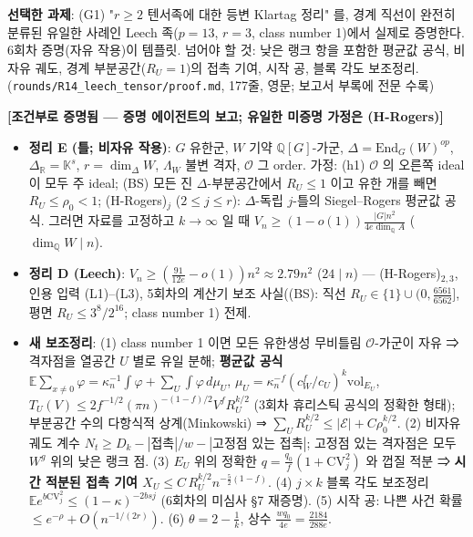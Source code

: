 \textbf{선택한 과제}: (G1) "\(r\ge2\) 텐서족에 대한 등변 Klartag 정리" 를, 경계 직선이 완전히 분류된 유일한 사례인 Leech 족(\(p=13\), \(r=3\), class number 1)에서 실제로 증명한다. 6회차 증명(자유 작용)이 템플릿. 넘어야 할 것: 낮은 랭크 항을 포함한 평균값 공식, 비자유 궤도, 경계 부분공간(\(R_U=1\))의 접촉 기여, 시작 공, 블록 각도 보조정리. (\texttt{rounds/R14\_leech\_tensor/proof.md}, 177줄, 영문; 보고서 부록에 전문 수록)

\textbf{{[}조건부로 증명됨 --- 증명 에이전트의 보고; 유일한 미증명 가정은 (H-Rogers){]}}

\begin{itemize}
\tightlist
\item
  \textbf{정리 E (틀; 비자유 작용)}: \(G\) 유한군, \(W\) 기약 \(\mathbb Q[G]\)-가군, \(\Delta=\mathrm{End}_G(W)^{op}\), \(\Delta_\mathbb R=\mathbb K^s\), \(r=\dim_\Delta W\), \(\Lambda_W\) 불변 격자, \(\mathcal O\) 그 order. 가정: (h1) \(\mathcal O\) 의 오른쪽 ideal 이 모두 주 ideal; (BS) 모든 진 \(\Delta\)-부분공간에서 \(R_U\le1\) 이고 유한 개를 빼면 \(R_U\le\rho_0<1\); (H-Rogers)\(_j\) (\(2\le j\le r\)): \(\Delta\)-독립 \(j\)-틀의 Siegel--Rogers 평균값 공식. 그러면 자료를 고정하고 \(k\to\infty\) 일 때 \(V_n\ge(1-o(1))\frac{|G|n^2}{4e\dim_\mathbb QA}\) (\(\dim_\mathbb QW\mid n\)).
\item
  \textbf{정리 D (Leech)}: \(V_n\ge(\frac{91}{12e}-o(1))n^2\approx2.79n^2\) (\(24\mid n\)) --- (H-Rogers)\(_{2,3}\), 인용 입력 (L1)--(L3), 5회차의 계산기 보조 사실((BS): 직선 \(R_U\in\{1\}\cup(0,\frac{6561}{6562}]\), 평면 \(R_U\le3^8/2^{16}\); class number 1) 전제.
\item
  \textbf{새 보조정리}: (1) class number 1 이면 모든 유한생성 무비틀림 \(\mathcal O\)-가군이 자유 ⇒ 격자점을 열공간 \(U\) 별로 유일 분해; \textbf{평균값 공식} \(\mathbb E\sum_{x\ne0}\varphi=\kappa_n^{-1}\int\varphi+\sum_U\int\varphi\,d\mu_U\), \(\mu_U=\kappa_n^{-f}(c_W^f/c_U)^k\mathrm{vol}_{E_U}\), \(T_U(V)\le2f^{-1/2}(\pi n)^{-(1-f)/2}V^fR_U^{k/2}\) (3회차 휴리스틱 공식의 정확한 형태); 부분공간 수의 다항식적 상계(Minkowski) ⇒ \(\sum_UR_U^{k/2}\le|\mathcal E|+C\rho_0^{k/2}\). (2) 비자유 궤도 계수 \(N_t\ge D_k-|\text{접촉}|/w-|\text{고정점 있는 접촉}|\); 고정점 있는 격자점은 모두 \(W^g\) 위의 낮은 랭크 점. (3) \(E_U\) 위의 정확한 \(q=\frac{q_0}f(1+\mathrm{CV}_j^2)\) 와 껍질 적분 ⇒ \textbf{시간 적분된 접촉 기여 \(X_U\le C\,R_U^{k/2}n^{-\frac52(1-f)}\)}. (4) \(j\times k\) 블록 각도 보조정리 \(\mathbb Ee^{b\mathrm{CV}_j^2}\le(1-\kappa)^{-2bsj}\) (6회차의 미심사 §7 재증명). (5) 시작 공: 나쁜 사건 확률 \(\le e^{-\rho}+O(n^{-1/(2r)})\). (6) \(\theta=2-\frac1k\), 상수 \(\frac{wq_0}{4e}=\frac{2184}{288e}\).

\end{itemize}
